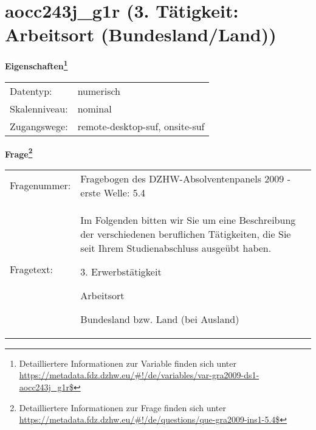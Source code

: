
    \setcounter{footnote}{0}

    \vspace*{-1.8cm}
	\section{aocc243j\_g1r (3. Tätigkeit: Arbeitsort (Bundesland/Land))}
	\label{section:aocc243j_g1r}



    \vspace*{0.5cm}
    \noindent\textbf{Eigenschaften\footnote{Detailliertere Informationen zur Variable finden sich unter
		\url{https://metadata.fdz.dzhw.eu/\#!/de/variables/var-gra2009-ds1-aocc243j_g1r$}}}\\
	\begin{tabularx}{\hsize}{@{}lX}
	Datentyp: & numerisch \\
	Skalenniveau: & nominal \\
	Zugangswege: &
	  remote-desktop-suf, 
	  onsite-suf
 \\
    \end{tabularx}



				\vspace*{0.5cm}
                \noindent\textbf{Frage\footnote{Detailliertere Informationen zur Frage finden sich unter
		              \url{https://metadata.fdz.dzhw.eu/\#!/de/questions/que-gra2009-ins1-5.4$}}}\\
				\begin{tabularx}{\hsize}{@{}lX}
					Fragenummer: &
					  Fragebogen des DZHW-Absolventenpanels 2009 - erste Welle:
					  5.4
 \\
					Fragetext: & Im Folgenden bitten wir Sie um eine Beschreibung der verschiedenen beruflichen Tätigkeiten, die Sie seit Ihrem Studienabschluss ausgeübt haben.\par  3. Erwerbstätigkeit\par  Arbeitsort\par  Bundesland bzw. Land (bei Ausland) \\
				\end{tabularx}





